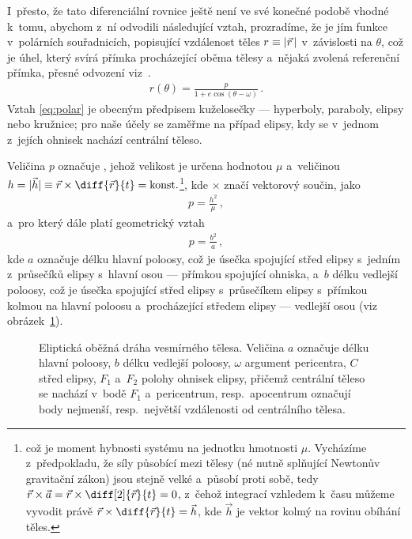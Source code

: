 \documentclass[A4paper, 12pt, oneside]{book}
\begin{document}
I~přesto, že tato diferenciální rovnice ještě není ve své konečné podobě vhodné k~tomu, abychom z~ní odvodili následující vztah, prozradíme, že je jím funkce v~polárních souřadnicích, popisující vzdálenost těles $r\equiv\lvert \vec{r} \,\rvert$ v~závislosti na  $\theta$, což je úhel, který svírá přímka procházející oběma tělesy a~nějaká zvolená referenční přímka, přesné odvození viz~\cite{murray00}.
\begin{align} \label{eq:polar}
	r(\theta)=\frac{p}{1+e\cos{(\theta-\omega)}}\,.
\end{align}
Vztah \eqref{eq:polar} je obecným předpisem kuželosečky --- hyperboly, paraboly, elipsy nebo kružnice; pro naše účely se zaměřme na případ elipsy, kdy se v~jednom z~jejích ohnisek nachází centrální těleso.

Veličina $p$ označuje , jehož velikost je určena hodnotou $\mu$ a~veličinou~$h=|\vec{h}| \equiv \vec{r}\times\diff{\vec{r}}{t}={\rm konst.}$\footnote{což je  moment hybnosti systému na jednotku hmotnosti $\mu$. Vycházíme z~předpokladu, že síly působící mezi tělesy (né nutně splňující Newtonův gravitační zákon) jsou stejně velké a~působí proti sobě, tedy $\vec{r}\times\vec{a}=\vec{r}\times\diff[2]{\vec{r}}{t}=0$, z~čehož integrací vzhledem k~času můžeme vyvodit právě $\vec{r}\times\diff{\vec{r}}{t}=\vec{h}$, kde $\vec{h}$ je vektor kolmý na rovinu obíhání těles.}, kde $\times$ značí vektorový součin, jako
\begin{align}
	p=\frac{h^2}{\mu}\,,
\end{align}
a~pro který dále platí geometrický vztah
\begin{align}
	p=\frac{b^2}{a}\,,
\end{align}
kde $a$ označuje délku hlavní poloosy, což je úsečka spojující střed elipsy s~jedním z~průsečíků elipsy s~hlavní osou --- přímkou spojující ohniska, a~$b$ délku vedlejší poloosy, což je úsečka spojující střed elipsy s~průsečíkem elipsy s~přímkou kolmou na hlavní poloosu a~procházející středem elipsy --- vedlejší osou (viz obrázek~\ref{fig:elip}).

\begin{figure}
	\centering
	\caption{Eliptická oběžná dráha vesmírného tělesa. Veličina $a$ označuje délku hlavní poloosy, $b$ délku vedlejší poloosy, $\omega$ argument pericentra, $C$ střed elipsy, $F_1$ a~$F_2$ polohy ohnisek elipsy, přičemž centrální těleso se nachází v~bodě $F_1$ a~pericentrum, resp.\ apocentrum označují body nejmenší, resp.\ největší vzdálenosti od centrálního tělesa.} \label{fig:elip}
\end{figure}
\end{document}
